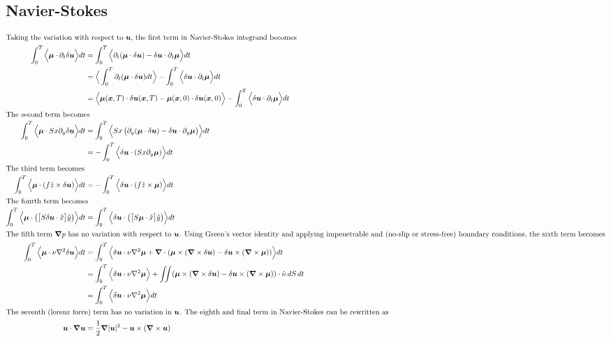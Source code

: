 \documentclass{article}
\renewcommand{\vec}[1]{\boldsymbol{#1}}
\newcommand{\grad}{\vec{\nabla}}
\newcommand{\laplacian}{\nabla^2}
\begin{document}
\subsection*{Navier-Stokes}
\begin{align*}
    \intertext{Taking the variation with respect to $\vec{u}$, the first term in Navier-Stokes integrand becomes}
    \int_0^T \Big\langle \vec{\mu} \cdot \partial_t\delta \vec{u} \Big\rangle dt &= \int_0^T \Big\langle \partial_t (\vec{\mu} \cdot \delta \vec{u}) - \delta \vec{u}\cdot\partial_t \vec{\mu} \Big\rangle dt\\
    &= \Big\langle\int_0^T \partial_t (\vec{\mu} \cdot \delta \vec{u}) dt \Big\rangle - \int_0^T \Big\langle \delta \vec{u}\cdot\partial_t \vec{\mu} \Big\rangle dt\\
    &= \Big\langle \vec{\mu}(\vec{x}, T) \cdot \delta \vec{u}(\vec{x}, T) - \vec{\mu}(\vec{x}, 0) \cdot \delta \vec{u}(\vec{x}, 0) \Big\rangle - \int_0^T \Big\langle \delta \vec{u}\cdot\partial_t \vec{\mu} \Big\rangle dt\\
    \intertext{The second term becomes}
    \int_0^T \Big\langle \vec{\mu} \cdot Sx\partial_y\delta\vec{u} \Big\rangle dt &= \int_0^T \Big\langle Sx \, \big(\partial_y(\vec{\mu} \cdot \delta\vec{u}) - \delta\vec{u}\cdot\partial_y\vec{\mu}\big) \Big\rangle dt\\
    &= -\int_0^T \Big\langle  \delta\vec{u}\cdot(Sx\partial_y\vec{\mu})\Big\rangle dt\\
    \intertext{The third term becomes}
    \int_0^T \Big\langle \vec{\mu} \cdot (f\hat{z}\times\delta\vec{u}) \Big\rangle dt &= -\int_0^T \Big\langle  \delta\vec{u}\cdot (f\hat{z}\times\vec{\mu}) \Big\rangle dt\\
    \intertext{The fourth term becomes}
    \int_0^T \Big\langle \vec{\mu} \cdot \big( \big[ S\delta\vec{u}\cdot\hat{x} \big] \hat{y}\big) \Big\rangle dt &= \int_0^T \Big\langle \delta\vec{u}\cdot \big(\big[ S\vec{\mu} \cdot\hat{x} \big] \hat{y}\big) \Big\rangle dt\\
    \intertext{The fifth term $\grad p$ has no variation with respect to $\vec{u}$. Using Green's vector identity and applying impenetrable and (no-slip or stress-free) boundary conditions, the sixth term becomes}
    \int_0^T \Big\langle \vec{\mu} \cdot \nu\laplacian\delta\vec{u} \Big\rangle dt &= \int_0^T \Big\langle \delta\vec{u} \cdot \nu\laplacian\vec{\mu} + \grad\cdot(\vec{\mu}\times(\grad\times\delta\vec{u}) - \delta\vec{u}\times(\grad\times\vec{\mu})) \Big\rangle dt\\
    &= \int_0^T \Big\langle \delta\vec{u} \cdot \nu\laplacian\vec{\mu}\Big\rangle + \iint (\vec{\mu}\times(\grad\times\delta\vec{u}) - \delta\vec{u}\times(\grad\times\vec{\mu})) \cdot \hat{n}\, dS\, dt\\
    &= \int_0^T \Big\langle \delta\vec{u} \cdot \nu\laplacian\vec{\mu}\Big\rangle dt\\
    \intertext{The seventh (lorenz force) term has no variation in $\vec{u}$. The eighth and final term in Navier-Stokes  can be rewritten as}
    \vec{u}\cdot\grad\vec{u} &= \frac{1}{2}\grad |\vec{u}|^2 - \vec{u}\times(\grad\times\vec{u}) \\
\end{align*}
\end{document}
